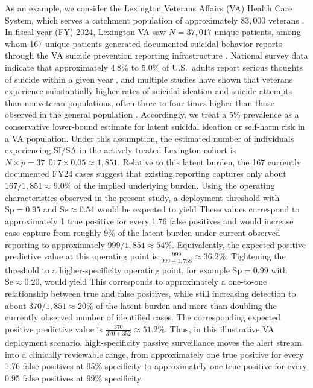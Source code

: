 \documentclass[onecolumn, compsoc,11pt]{IEEEtran}
\begin{document}
As an example, we consider the Lexington Veterans Affairs (VA) Health Care System, which serves a catchment population of approximately $83{,}000$ veterans \cite{VA_Lexington_About}. In fiscal year (FY) 2024, Lexington VA saw $N = 37{,}017$ unique patients, among whom 167 unique patients generated documented suicidal behavior reports through the VA suicide prevention reporting infrastructure \cite{VA_VINCI_Lexington_2024}. National survey data indicate that approximately 4.8\% to 5.0\% of U.S.\ adults report serious thoughts of suicide within a given year \cite{SAMHSA_2023_NSduh}, and multiple studies have shown that veterans experience substantially higher rates of suicidal ideation and suicide attempts than nonveteran populations, often three to four times higher than those observed in the general population \cite{NHRVS_Suicide_Ideation,VA_Suicide_Report_2023}. Accordingly, we treat a 5\% prevalence as a conservative lower-bound estimate for latent suicidal ideation or self-harm risk in a VA population. Under this assumption, the estimated number of individuals experiencing SI/SA in the actively treated Lexington cohort is
$ N \times p = 37{,}017 \times 0.05 \approx 1{,}851.$ Relative to this latent burden, the 167 currently documented FY24 cases suggest that existing reporting captures only about $ 167/1{,}851 \approx 9.0\% $
of the implied underlying burden. Using the operating characteristics observed in the present study, a deployment threshold with $\mathrm{Sp}=0.95$ and $\mathrm{Se}\approx0.54$ would be expected to yield
These values correspond to approximately 1 true positive for every 1.76 false positives and would increase case capture from roughly 9\% of the latent burden under current observed reporting to approximately $ 999/1{,}851 \approx 54\%.$
Equivalently, the expected positive predictive value at this operating point is $\frac{999}{999+1{,}758} \approx 36.2\%.$
Tightening the threshold to a higher-specificity operating point, for example $\mathrm{Sp}=0.99$ with $\mathrm{Se}\approx0.20$, would yield
This corresponds to approximately a one-to-one relationship between true and false positives, while still increasing detection to about $ 370/1{,}851 \approx 20\%$ of the latent burden and more than doubling the currently observed number of identified cases. The corresponding expected positive predictive value is
$\frac{370}{370+352} \approx 51.2\%.$ Thus, in this illustrative VA deployment scenario, high-specificity passive surveillance moves the alert stream into a clinically reviewable range, from approximately one true positive for every 1.76 false positives at 95\% specificity to approximately one true positive for every 0.95 false positives at 99\% specificity.
\end{document}
